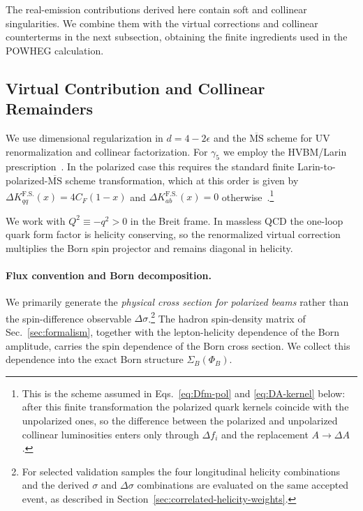 \documentclass[a4paper,11pt]{article}
\begin{document}
The real-emission contributions derived here contain soft and collinear singularities. We combine them with the virtual corrections and collinear counterterms in the next subsection, obtaining the finite ingredients used in the POWHEG calculation.

\subsection{Virtual Contribution and Collinear Remainders}
\label{sec:virt-coll-pol}

We use dimensional regularization in $d=4-2\epsilon$ and the $\overline{\text{MS}}$ scheme for UV renormalization and collinear factorization. For $\gamma_5$ we employ the HVBM/Larin prescription~\cite{tHooft:1972tcz,Breitenlohner:1977hr,Larin:1993tq}. In the polarized case this requires the standard finite Larin-to-polarized-$\overline{\text{MS}}$ scheme transformation, which at this order is given by $\Delta K^{\text{F.S.}}_{qq}(x)=4C_F(1-x)$ and $\Delta K^{\text{F.S.}}_{ab}(x)=0$ otherwise~\cite{Mertig:1995ny,Vogelsang:1996im}.\footnote{This is the scheme assumed in Eqs.~\eqref{eq:Dfm-pol} and \eqref{eq:DA-kernel} below: after this finite transformation the polarized quark kernels coincide with the unpolarized ones, so the difference between the polarized and unpolarized collinear luminosities enters only through $\Delta f_i$ and the replacement $A\to\Delta A$.}


We work with $Q^2\equiv -q^2>0$ in the Breit frame. In massless QCD the one-loop quark form factor is helicity conserving, so the renormalized virtual correction multiplies the Born spin projector and remains diagonal in helicity.

\paragraph{Flux convention and Born decomposition.}
We primarily generate the \emph{physical cross section for polarized beams} rather than the spin-difference observable $\Delta\sigma$.\footnote{For selected validation samples the four longitudinal helicity combinations and the derived $\sigma$ and $\Delta\sigma$ combinations are evaluated on the same accepted event, as described in Section~\ref{sec:correlated-helicity-weights}.}
The hadron spin-density matrix of Sec.~\ref{sec:formalism}, together with the lepton-helicity dependence of the Born amplitude, carries the spin dependence of the Born cross section. We collect this dependence into the exact Born structure $\Sigma_B(\Phi_B)$.
\end{document}
